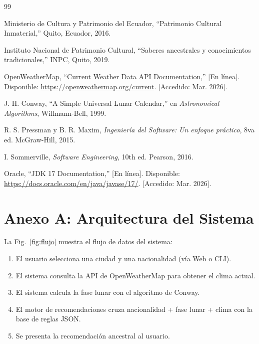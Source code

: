 \documentclass[conference]{IEEEtran}
\begin{document}
\begin{thebibliography}{99}

Ministerio de Cultura y Patrimonio del Ecuador, ``Patrimonio Cultural Inmaterial,'' Quito, Ecuador, 2016.

Instituto Nacional de Patrimonio Cultural, ``Saberes ancestrales y conocimientos tradicionales,'' INPC, Quito, 2019.

OpenWeatherMap, ``Current Weather Data API Documentation,'' [En línea]. Disponible: \url{https://openweathermap.org/current}. [Accedido: Mar. 2026].

J. H. Conway, ``A Simple Universal Lunar Calendar,'' en \textit{Astronomical Algorithms}, Willmann-Bell, 1999.

R. S. Pressman y B. R. Maxim, \textit{Ingeniería del Software: Un enfoque práctico}, 8va ed. McGraw-Hill, 2015.

I. Sommerville, \textit{Software Engineering}, 10th ed. Pearson, 2016.

Oracle, ``JDK 17 Documentation,'' [En línea]. Disponible: \url{https://docs.oracle.com/en/java/javase/17/}. [Accedido: Mar. 2026].

\end{thebibliography}

\appendix

\section{Anexo A: Arquitectura del Sistema}


La Fig.~\ref{fig:flujo} muestra el flujo de datos del sistema:

\begin{enumerate}
    \item El usuario selecciona una ciudad y una nacionalidad (vía Web o CLI).
    \item El sistema consulta la API de OpenWeatherMap para obtener el clima actual.
    \item El sistema calcula la fase lunar con el algoritmo de Conway.
    \item El motor de recomendaciones cruza nacionalidad + fase lunar + clima con la base de reglas JSON.
    \item Se presenta la recomendación ancestral al usuario.
\end{enumerate}
\end{document}
